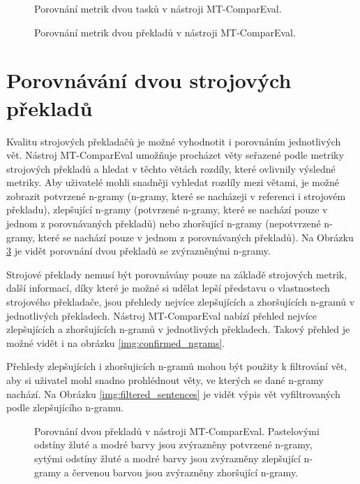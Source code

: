 \begin{figure}
	\caption{Porovnání metrik dvou tasků v nástroji MT-ComparEval.}
	\label{img:compare_metrics_tasks}
\end{figure}

\begin{figure}
	\caption{Porovnání metrik dvou překladů v nástroji MT-ComparEval.}
	\label{img:compare_metrics_sentences}
\end{figure}


\section{Porovnávání dvou strojových překladů}
Kvalitu strojových překladačů je možné vyhodnotit i porovnáním jednotlivých vět.
Nástroj MT-ComparEval umožňuje procházet věty seřazené podle metriky strojových překladů 
  a hledat v těchto větách rozdíly,
  které ovlivnily výsledné metriky.
Aby uživatelé mohli snadněji vyhledat rozdíly mezi větami,
	  je možné zobrazit potvrzené \mbox{n-gramy} (\mbox{n-gramy}, které se nacházeji v referenci i strojovém překladu),
	  zlepšující \mbox{n-gramy} (potvrzené \mbox{n-gramy}, které se nachází pouze v jednom z porovnávaných překladů)
	  nebo zhoršující \mbox{n-gramy} (nepotvrzené \mbox{n-gramy}, které se nachází pouze v jednom z porovnávaných překladů).
	Na Obrázku \ref{img:compare_sentences} je vidět porovnání dvou překladů se zvýrazněnými \mbox{n-gramy}.

	Strojové překlady nemusí být porovnávány pouze na základě strojových metrik,
	  další informací,
	  díky které je možné si udělat lepší představu o vlastnostech strojového překladače,
	  jsou přehledy nejvíce zlepšujících a zhoršujících \mbox{n-gramů} v jednotlivých překladech.
	Nástroj MT-ComparEval nabízí přehled nejvíce zlepšujících a zhoršujících \mbox{n-gramů}
	  v jednotlivých překladech.
	Takový přehled je možné vidět i na obrázku \ref{img:confirmed_ngrams}.

	Přehledy zlepšujících i zhoršujicích \mbox{n-gramů} mohou být použity k filtrování vět,
	  aby si uživatel mohl snadno prohlédnout věty,
	  ve kterých se dané \mbox{n-gramy} nachází.
	Na Obrázku \ref{img:filtered_sentences} je vidět výpis vět vyfiltrovaných podle zlepšujícího \mbox{n-gramu}.

	\begin{figure}
		\caption{
			Porovnání dvou překladů v nástroji MT-ComparEval.
			Pastelovými odstíny žluté a modré barvy jsou zvýrazněny potvrzené \mbox{n-gramy},
			sytými odstíny žluté a modré barvy jsou zvýrazněny zlepšující \mbox{n-gramy}
			a červenou barvou jsou zvýrazněny zhoršující \mbox{n-gramy}.
		}
		\label{img:compare_sentences}
	\end{figure}

